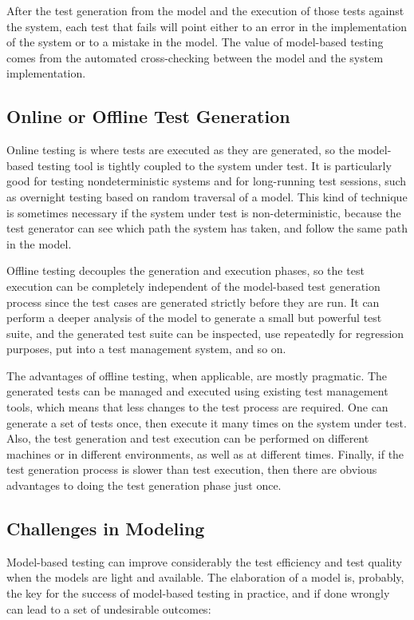 After the test generation from the model and the execution of those tests against the system, each test that fails will point either to an error in the implementation of the system or to a mistake in the model. The value of model-based testing comes from the automated cross-checking between the model and the system implementation.

\subsection{Online or Offline Test Generation}

Online testing is where tests are executed as they are generated, so the
model-based testing tool is tightly coupled to the system under test. It is
particularly good for testing nondeterministic systems and for long-running test
sessions, such as overnight testing based on random traversal of a model. This
kind of technique is sometimes necessary if the system under test is
non-deterministic, because the test generator can see which path the system has
taken, and follow the same path in the model.

Offline testing decouples the generation and execution phases, so the test
execution can be completely independent of the model-based test generation
process since the test cases are generated strictly before they are run. It can
perform a deeper analysis of the model to generate a small but
powerful test suite, and the generated test suite can be inspected, use
repeatedly for regression purposes, put into a test management system, and so on.

The advantages of offline testing, when applicable, are mostly pragmatic. The
generated tests can be managed and executed using existing test management tools,
which means that less changes to the test process are required. One can generate
a set of tests once, then execute it many times on the system under test. Also,
the test generation and test execution can be performed on different
machines or in different environments, as well as at different times. Finally,
if the test generation process is slower than test execution, then there are
obvious advantages to doing the test generation phase just once.
 
\subsection{Challenges in Modeling}
Model-based testing can improve considerably the test 
efficiency and test quality when the models are light 
and available. The elaboration of a model is, probably, 
the key for the success of model-based testing in practice,
and if done wrongly~\cite{Peleska.2013} can lead to a set of undesirable 
outcomes:

